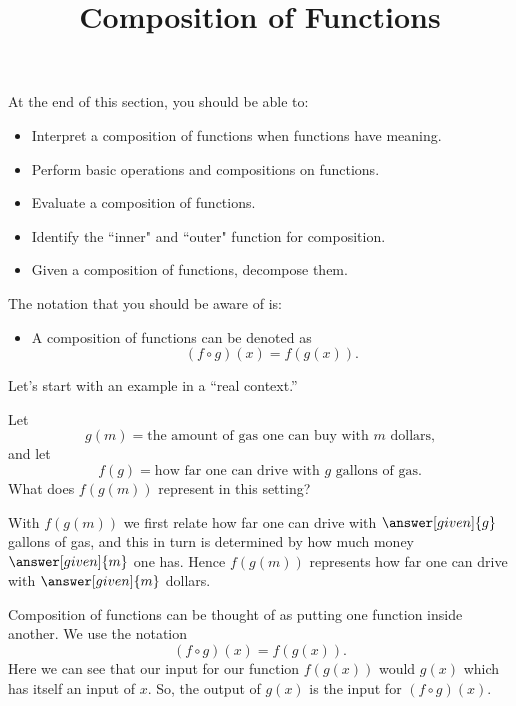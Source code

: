 \documentclass{ximera}
\title{Composition of Functions}
\begin{document}
\begin{abstract} \end{abstract}
\maketitle

At the end of this section, you should be able to:
\begin{itemize}
    \item Interpret a composition of functions when functions have meaning.
    \item Perform basic operations and compositions on functions.
      \item Evaluate a composition of functions.
      \item Identify the ``inner" and ``outer" function for composition.
    \item Given a composition of functions, decompose them.
    
  
\end{itemize}

The notation that you should be aware of is:
\begin{itemize}
    \item A composition of functions can be denoted as $$(f\circ g)(x)=f(g(x)).$$
\end{itemize}
Let's start with an example in a
``real context.''

\begin{example}
  Let
  \[
  g(m) = \text{the amount of gas one can buy with $m$ dollars,}
  \]
  and let
  \[
  f(g) = \text{how far one can drive with $g$ gallons of gas.}
  \]
  What does $f(g(m))$ represent in this setting?
  \begin{explanation}
    With $f(g(m))$ we first relate how far one can drive with
    $\answer[given]{g}$ gallons of gas, and this in turn is determined
    by how much money $\answer[given]{m}$ one has. Hence $f(g(m))$ represents how far
    one can drive with $\answer[given]{m}$ dollars.
  \end{explanation}
\end{example}

Composition of functions can be thought of as putting one function
inside another.  We use the notation
\[
(f\circ g)(x) = f(g(x)).
\]
Here we can see that our input for our function $f(g(x))$ would $g(x)$ which has itself an input of $x$. So, the output of $g(x)$ is the input for $(f\circ g)(x)$.
\end{document}
